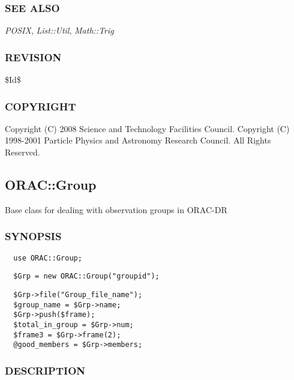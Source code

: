\subsubsection*{SEE ALSO\label{ORAC::General_SEE_ALSO}}


\emph{POSIX},
\emph{List::Util},
\emph{Math::Trig}

\subsubsection*{REVISION\label{ORAC::General_REVISION}}


\$Id\$

\subsubsection*{COPYRIGHT\label{ORAC::General_COPYRIGHT}}


Copyright (C) 2008 Science and Technology Facilities Council.
Copyright (C) 1998-2001 Particle Physics and Astronomy Research
Council. All Rights Reserved.

\subsection{ORAC::Group\label{ORAC::Group}}


Base class for dealing with observation groups in ORAC-DR

\subsubsection*{SYNOPSIS\label{ORAC::Group_SYNOPSIS}}
\begin{verbatim}
  use ORAC::Group;
\end{verbatim}
\begin{verbatim}
  $Grp = new ORAC::Group("groupid");
\end{verbatim}
\begin{verbatim}
  $Grp->file("Group_file_name");
  $group_name = $Grp->name;
  $Grp->push($frame);
  $total_in_group = $Grp->num;
  $frame3 = $Grp->frame(2);
  @good_members = $Grp->members;
\end{verbatim}
\subsubsection*{DESCRIPTION\label{ORAC::Group_DESCRIPTION}}


